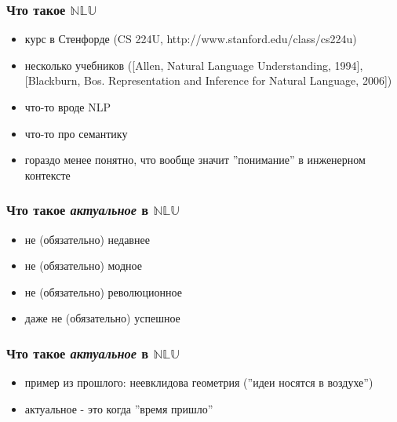 \documentclass{beamer}
\begin{document}
\begin{frame}[fragile]
\frametitle{Что такое $\mathbb{NLU}$}
\begin{itemize}
  \item курс в Стенфорде ({\scriptsize CS 224U, http://www.stanford.edu/class/cs224u})     
  \item несколько учебников ({\scriptsize [Allen, Natural Language Understanding, 1994], [Blackburn, Bos. Representation and Inference for Natural Language, 2006]})
  \item что-то вроде NLP
  \item что-то про семантику 
  \item гораздо менее понятно, что вообще значит ''понимание'' в инженерном контексте
\end{itemize}
\end{frame}

\begin{frame}[fragile]
\frametitle{Что такое \textit{актуальное} в $\mathbb{NLU}$}
\begin{itemize}
  \item не (обязательно) недавнее
  \item не (обязательно) модное
  \item не (обязательно) революционное
  \item даже не (обязательно) успешное
\end{itemize}
\end{frame}

\begin{frame}[fragile]
\frametitle{Что такое \textit{актуальное} в $\mathbb{NLU}$}
\begin{itemize}
  \item пример из прошлого: неевклидова геометрия (''идеи носятся в воздухе'')
  \item актуальное - это когда ''время пришло''
\end{itemize}
\end{frame}
\end{document}
